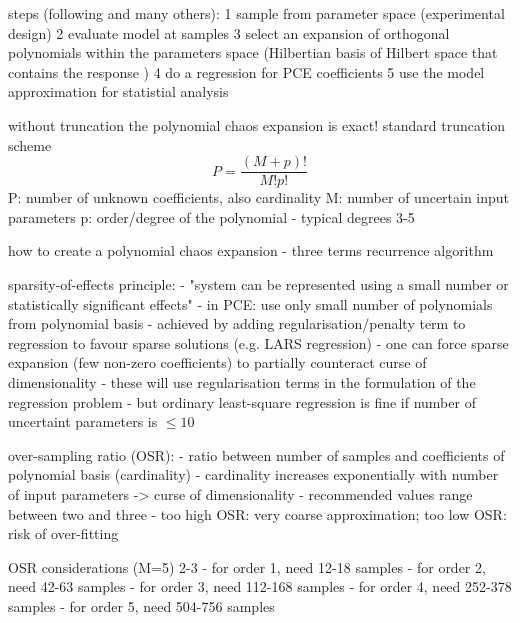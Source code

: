 steps (following \cite{feinberg_chaospy_2015} and many others):
1 sample from parameter space (experimental design)
2 evaluate model at samples
3 select an expansion of orthogonal polynomials within the parameters space (Hilbertian basis of Hilbert space that contains the response \cite{sudret_global_2008})
4 do a regression for PCE coefficients
5 use the model approximation for statistial analysis

without truncation the polynomial chaos expansion is exact! \cite{fajraoui_optimal_2017}
standard truncation scheme \cite{gratiet_metamodel-based_2015,sudret_global_2008}
\begin{equation}
    P = \frac{(M+p)!}{M!p!}
\end{equation}
P: number of unknown coefficients, also cardinality
M: number of uncertain input parameters
p: order/degree of the polynomial
- typical degrees 3-5 \cite{gratiet_metamodel-based_2015}

how to create a polynomial chaos expansion
- three terms recurrence algorithm \cite{feinberg_chaospy_2015}

sparsity-of-effects principle:
- "system can be represented using a small number or statistically significant effects" \cite{berchier_multi-fidelity_nodate}
- in PCE: use only small number of polynomials from polynomial basis
- achieved by adding regularisation/penalty term to regression to favour sparse solutions (e.g. LARS regression)
- one can force sparse expansion (few non-zero coefficients) to partially counteract curse of dimensionality \cite{gratiet_metamodel-based_2015}
- these will use regularisation terms in the formulation of the regression problem
- but ordinary least-square regression is fine if number of uncertaint parameters is $\leq 10$ \cite{gratiet_metamodel-based_2015}

over-sampling ratio (OSR):
- ratio between number of samples and coefficients of polynomial basis (cardinality) \cite{palar_multi-fidelity_2016}
- cardinality increases exponentially with number of input parameters -> curse of dimensionality
- recommended values range between two and three \cite{hosder2007,palar_multi-fidelity_2016,fajraoui_optimal_2017,gratiet_metamodel-based_2015}
- too high OSR: very coarse approximation; too low OSR: risk of over-fitting \cite{palar_multi-fidelity_2016}

OSR considerations (M=5) 2-3
- for order 1, need 12-18 samples
- for order 2, need 42-63 samples
- for order 3, need 112-168 samples
- for order 4, need 252-378 samples
- for order 5, need 504-756 samples

